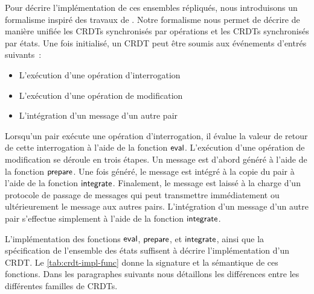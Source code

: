 Pour décrire l'implémentation de ces ensembles répliqués, nous introduisons un formalisme inspiré des travaux de \textcite{baquero_2018_pure-op-crdt}.
Notre formalisme nous permet de décrire de manière unifiée les \acp{CRDT} synchronisés par opérations et les \acp{CRDT} synchronisés par états.
Une fois initialisé, un \ac{CRDT} peut être soumis aux événements d'entrés suivants~:
\begin{itemize}
\item L'exécution d'une opération d'interrogation
\item L'exécution d'une opération de modification
\item L'intégration d'un message d'un autre pair
\end{itemize}

Lorsqu'un pair exécute une opération d'interrogation, il évalue la valeur de retour de cette interrogation à l'aide de la fonction $\operatorname{\mathsf{eval}}$.
L'exécution d'une opération de modification se déroule en trois étapes.
Un message est d'abord généré à l'aide de la fonction $\operatorname{\mathsf{prepare}}$.
Une fois généré, le message est intégré à la copie du pair à l'aide de la fonction $\operatorname{\mathsf{integrate}}$.
Finalement, le message est laissé à la charge d'un protocole de passage de messages qui peut transmettre immédiatement ou ultérieurement le message aux autres pairs.
L'intégration d'un message d'un autre pair s'effectue simplement à l'aide de la fonction $\operatorname{\mathsf{integrate}}$.

L'implémentation des fonctions $\operatorname{\mathsf{eval}}$, $\operatorname{\mathsf{prepare}}$, et $\operatorname{\mathsf{integrate}}$, ainsi que la spécification de l'ensemble des états suffisent à décrire l'implémentation d'un \ac{CRDT}.
Le \autoref{tab:crdt-impl-func} donne la signature et la sémantique de ces fonctions.
Dans les paragraphes suivants nous détaillons les différences entre les différentes familles de \acp{CRDT}.

